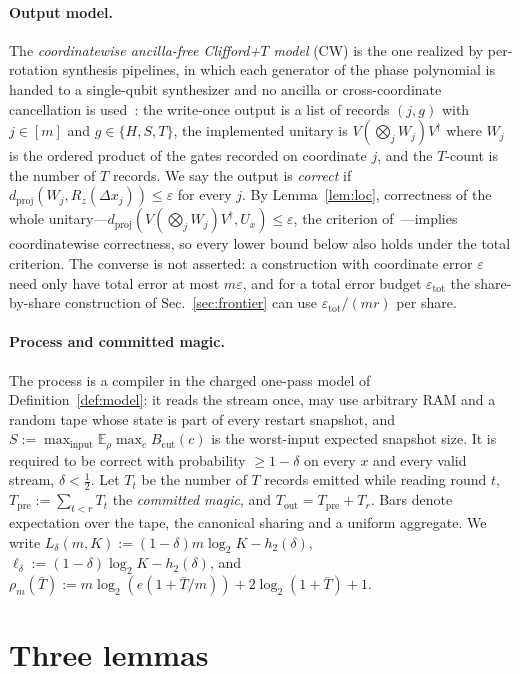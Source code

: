 \documentclass[aps,prx,twocolumn,superscriptaddress,nofootinbib,longbibliography]{revtex4-2}
\theoremstyle{plain}
\theoremstyle{definition}
\theoremstyle{remark}
\newcommand{\dproj}{d_{\mathrm{proj}}}
\newcommand{\Tpre}{T_{\mathrm{pre}}}
\newcommand{\Tout}{T_{\mathrm{out}}}
\newcommand{\E}{\mathbb{E}}
\begin{document}
\paragraph{Output model.} The \emph{coordinatewise ancilla-free Clifford+$T$ model} (CW) is the one realized by per-rotation synthesis pipelines, in which each generator of the phase polynomial is handed to a single-qubit synthesizer and no ancilla or cross-coordinate cancellation is used~\cite{RossSelinger,Paper1}: the write-once output is a list of records $(j,g)$ with $j\in[m]$ and $g\in\{H,S,T\}$, the implemented unitary is $V(\bigotimes_jW_j)V^\dagger$ where $W_j$ is the ordered product of the gates recorded on coordinate $j$, and the $T$-count is the number of $T$ records. We say the output is \emph{correct} if $\dproj(W_j,R_z(\Delta x_j))\le\varepsilon$ for every $j$. By Lemma~\ref{lem:loc}, correctness of the whole unitary---$\dproj(V(\bigotimes_jW_j)V^\dagger,U_x)\le\varepsilon$, the criterion of~\cite{Paper1}---implies coordinatewise correctness, so every lower bound below also holds under the total criterion. The converse is not asserted: a construction with coordinate error $\varepsilon$ need only have total error at most $m\varepsilon$, and for a total error budget $\varepsilon_{\mathrm{tot}}$ the share-by-share construction of Sec.~\ref{sec:frontier} can use $\varepsilon_{\mathrm{tot}}/(mr)$ per share.

\paragraph{Process and committed magic.} The process is a compiler in the charged one-pass model of Definition~\ref{def:model}: it reads the stream once, may use arbitrary RAM and a random tape whose state is part of every restart snapshot, and $S:=\max_{\text{input}}\E_\rho\max_cB_{\mathrm{cut}}(c)$ is the worst-input expected snapshot size. It is required to be correct with probability $\ge1-\delta$ on every $x$ and every valid stream, $\delta<\tfrac12$. Let $T_t$ be the number of $T$ records emitted while reading round $t$, $\Tpre:=\sum_{t<r}T_t$ the \emph{committed magic}, and $\Tout=\Tpre+T_r$. Bars denote expectation over the tape, the canonical sharing and a uniform aggregate. We write $L_\delta(m,K):=(1-\delta)m\log_2K-h_2(\delta)$, $\ell_\delta:=(1-\delta)\log_2K-h_2(\delta)$, and $\rho_m(\bar T):=m\log_2(e(1+\bar T/m))+2\log_2(1+\bar T)+1$.

\section{Three lemmas}
\end{document}
